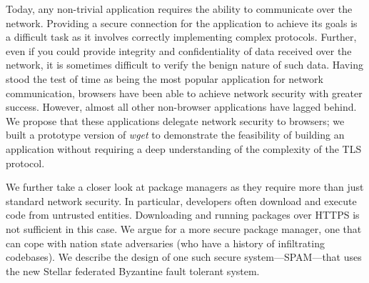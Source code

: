 Today, any non-trivial application requires the ability to communicate over the
network. Providing a secure connection for the application to achieve its goals
is a difficult task as it involves correctly implementing complex protocols.
Further, even if you could provide integrity and confidentiality of data
received over the network, it is sometimes difficult to verify the benign
nature of such data. Having stood the test of time as being the most popular
application for network communication, browsers have been able to achieve
network security with greater success. However, almost all other non-browser
applications have lagged behind. We propose that these applications delegate
network security to browsers; we built a prototype version of \emph{wget} to
demonstrate the feasibility of building an application without requiring a deep
understanding of the complexity of the TLS protocol.

We further take a closer look at package managers as they require more than
just standard network security. In particular, developers often download and
execute code from untrusted entities. Downloading and running packages over
HTTPS is not sufficient in this case. We argue for a more secure package
manager, one that can cope with nation state adversaries (who have a history of
infiltrating codebases). We describe the design of one such secure
system---SPAM---that uses the new Stellar federated Byzantine fault tolerant
system.
